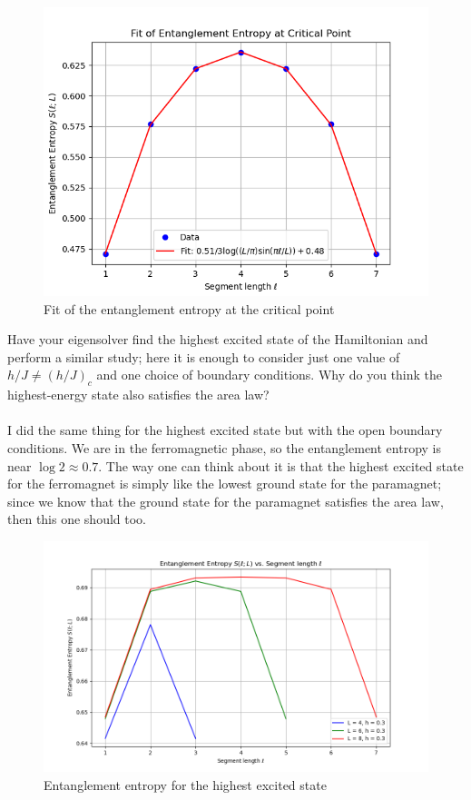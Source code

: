 \documentclass[12pt]{article}
\begin{document}
\begin{figure}
\centering
\includegraphics[width=\textwidth]{entanglement_entropy_fit.png}
\caption{Fit of the entanglement entropy at the critical point}
\end{figure}
\newpage

Have your eigensolver find the highest excited state of the Hamiltonian and perform a similar study; here it is enough to consider just one value of $h / J \neq (h / J)_{c}$ and one choice of boundary conditions. Why do you think the highest-energy state also satisfies the area law?\\\\
I did the same thing for the highest excited state but with the open boundary conditions. We are in the ferromagnetic phase, so the entanglement entropy is near $\log 2 \approx 0.7$. The way one can think about it is that the highest excited state for the ferromagnet is simply like the lowest ground state for the paramagnet; since we know that the ground state for the paramagnet satisfies the area law, then this one should too.
\begin{figure}
\centering
\includegraphics[width=\textwidth]{entanglement_entropy_LA.png}
\caption{Entanglement entropy for the highest excited state}
\end{figure}
\end{document}
